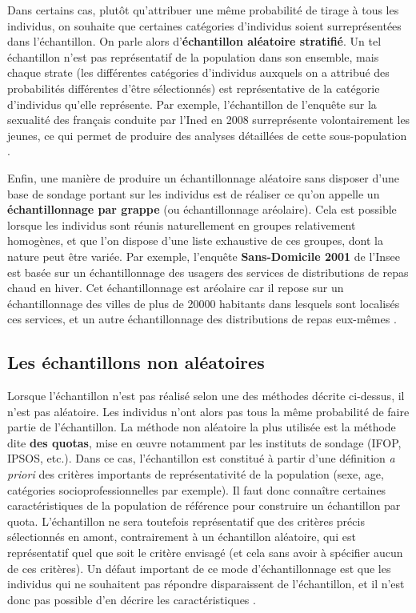 \documentclass[
  french,
]{book}
\begin{document}
Dans certains cas, plutôt qu'attribuer une même probabilité de tirage à tous les individus, on souhaite que certaines catégories d'individus soient surreprésentées dans l'échantillon. On parle alors d'\textbf{échantillon aléatoire stratifié}. Un tel échantillon n'est pas représentatif de la population dans son ensemble, mais chaque strate (les différentes catégories d'individus auxquels on a attribué des probabilités différentes d'être sélectionnés) est représentative de la catégorie d'individus qu'elle représente. Par exemple, l'échantillon de l'enquête sur la sexualité des français conduite par l'Ined en 2008 surreprésente volontairement les jeunes, ce qui permet de produire des analyses détaillées de cette sous-population \citep{toulemon2008}.

Enfin, une manière de produire un échantillonnage aléatoire sans disposer d'une base de sondage portant sur les individus est de réaliser ce qu'on appelle un \textbf{échantillonnage par grappe} (ou échantillonnage aréolaire). Cela est possible lorsque les individus sont réunis naturellement en groupes relativement homogènes, et que l'on dispose d'une liste exhaustive de ces groupes, dont la nature peut être variée. Par exemple, l'enquête \textbf{Sans-Domicile 2001} de l'Insee est basée sur un échantillonnage des usagers des services de distributions de repas chaud en hiver. Cet échantillonnage est aréolaire car il repose sur un échantillonnage des villes de plus de 20000 habitants dans lesquels sont localisés ces services, et un autre échantillonnage des distributions de repas eux-mêmes \citep{brousse2005}.

\hypertarget{les-uxe9chantillons-non-aluxe9atoires}{%
\subsection{Les échantillons non aléatoires}\label{les-uxe9chantillons-non-aluxe9atoires}}

Lorsque l'échantillon n'est pas réalisé selon une des méthodes décrite ci-dessus, il n'est pas aléatoire. Les individus n'ont alors pas tous la même probabilité de faire partie de l'échantillon. La méthode non aléatoire la plus utilisée est la méthode dite \textbf{des quotas}, mise en œuvre notamment par les instituts de sondage (IFOP, IPSOS, etc.). Dans ce cas, l'échantillon est constitué à partir d'une définition \emph{a priori} des critères importants de représentativité de la population (sexe, age, catégories socioprofessionnelles par exemple). Il faut donc connaître certaines caractéristiques de la population de référence pour construire un échantillon par quota. L'échantillon ne sera toutefois représentatif que des critères précis sélectionnés en amont, contrairement à un échantillon aléatoire, qui est représentatif quel que soit le critère envisagé (et cela sans avoir à spécifier aucun de ces critères). Un défaut important de ce mode d'échantillonnage est que les individus qui ne souhaitent pas répondre disparaissent de l'échantillon, et il n'est donc pas possible d'en décrire les caractéristiques \citep{lehingue2007}.
\end{document}
